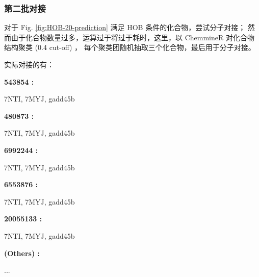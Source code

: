 \documentclass[
]{article}
\begin{document}
\hypertarget{ux7b2cux4e8cux6279ux5bf9ux63a5}{%
\subsubsection{第二批对接}\label{ux7b2cux4e8cux6279ux5bf9ux63a5}}

对于 Fig. \ref{fig:HOB-20-prediction} 满足 HOB 条件的化合物，尝试分子对接；
然而由于化合物数量过多，运算过于将过于耗时，这里，以 ChemmineR 对化合物结构聚类 (0.4 cut-off) ，
每个聚类团随机抽取三个化合物，最后用于分子对接。

实际对接的有：

\begin{center}\begin{tcolorbox}[colback=gray!10, colframe=gray!50, width=0.9\linewidth, arc=1mm, boxrule=0.5pt]
\textbf{
543854
:}

\vspace{0.5em}

    7NTI, 7MYJ, gadd45b

\vspace{2em}


\textbf{
480873
:}

\vspace{0.5em}

    7NTI, 7MYJ, gadd45b

\vspace{2em}


\textbf{
6992244
:}

\vspace{0.5em}

    7NTI, 7MYJ, gadd45b

\vspace{2em}


\textbf{
6553876
:}

\vspace{0.5em}

    7NTI, 7MYJ, gadd45b

\vspace{2em}


\textbf{
20055133
:}

\vspace{0.5em}

    7NTI, 7MYJ, gadd45b

\vspace{2em}


\textbf{
(Others)
:}

\vspace{0.5em}

    ...

\vspace{2em}
\end{tcolorbox}
\end{center}
\end{document}
